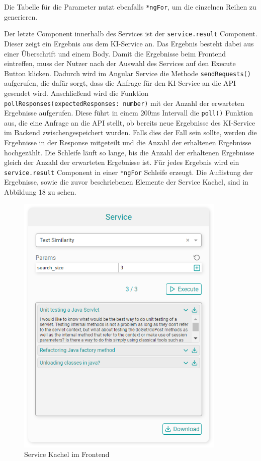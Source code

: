 Die Tabelle für die Parameter nutzt ebenfalls \texttt{*ngFor}, um die einzelnen Reihen zu generieren. 

Der letzte Component innerhalb des Services ist der \texttt{service.result} Component. Dieser zeigt ein Ergebnis aus dem KI-Service an. Das Ergebnis besteht dabei aus einer Überschrift und einem Body. Damit die Ergebnisse beim Frontend eintreffen, muss der Nutzer nach der Auswahl des Services auf den \glqq Execute\grqq{} Button klicken. Dadurch wird im Angular Service die Methode \texttt{sendRequests()} aufgerufen, die dafür sorgt, dass die Anfrage für den KI-Service an die API gesendet wird. Anschließend wird die Funktion \texttt{pollResponses(expectedResponses: number)} mit der Anzahl der erwarteten Ergebnisse aufgerufen. Diese führt in einem 200ms Intervall die \texttt{poll()} Funktion aus, die eine Anfrage an die API stellt, ob bereits neue Ergebnisse des KI-Service im Backend zwischengespeichert wurden. Falls dies der Fall sein sollte, werden die Ergebnisse in der Response mitgeteilt und die Anzahl der erhaltenen Ergebnisse hochgezählt. Die Schleife läuft so lange, bis die Anzahl der erhaltenen Ergebnisse gleich der Anzahl der erwarteten Ergebnisse ist. Für jedes Ergebnis wird ein \texttt{service.result} Component in einer \texttt{*ngFor} Schleife erzeugt. Die Auflistung der Ergebnisse, sowie die zuvor beschriebenen Elemente der \glqq Service\grqq{} Kachel, sind in Abbildung 18 zu sehen. 

\begin{figure}[H]
  \centering
    \includegraphics[width = 10cm]{bilder/websiteService}
    \caption{Service Kachel im Frontend}
\end{figure}

